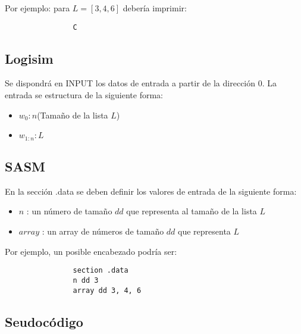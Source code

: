 \documentclass[a4paper]{article}
\begin{document}
\begin{flushleft}
      		 Por ejemplo: para $L = [3, 4, 6]$ debería imprimir:
      		 
      		 \begin{lstlisting}
      		 	C
      		 \end{lstlisting}
      		 
      		\subsection*{Logisim}
      		
      		Se dispondrá en INPUT los datos de entrada a partir de la dirección 0. La entrada se estructura de la siguiente forma:
      		
      		\begin{itemize}
      			
      			\item $w_{0}: n $(Tamaño de la lista $L$)
      			\item $w_{1:n} : L$
      		\end{itemize}
      		 
      		 	\subsection*{SASM}
      		 
      		 En la sección .data se deben definir los valores de entrada de la siguiente forma:
      		 
      		 \begin{itemize}
      		 	
      		 	\item $n$ : un número de tamaño $dd$ que representa al tamaño de la lista $L$
      		 	
      		 	\item $array$ : un array de números de tamaño $dd$ que representa $L$
      		 	
      		 	
      		 \end{itemize}
      		 
      		 Por ejemplo, un posible encabezado podría ser:
      		 
      		 \begin{lstlisting}
      		 	section .data
      		 	n dd 3
      		 	array dd 3, 4, 6
      		 \end{lstlisting}
      		 
      		 \subsection*{Seudocódigo}
      		 

\end{flushleft}
\end{document}
